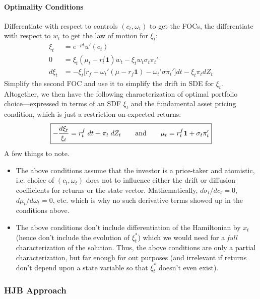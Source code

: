 \documentclass[12pt]{article}
\theoremstyle{plain}
\theoremstyle{definition}
\theoremstyle{remark}
\begin{document}
\paragraph{Optimality Conditions}
Differentiate with respect to controls $(c_t,\omega_t)$ to get the FOCs,
the differentiate with respect to $w_t$ to get the law of motion for
$\xi_t$:
\begin{align*}
  \xi_t
  &=
  e^{-\rho t}
  u'(c_t)
  \\
  0
  &=
  \xi_t(\mu_t-r^f_t\mathbf{1})w_t
  -
  \xi_t
  w_t \sigma_t\pi_t'
  \\
  d\xi_t
  &=
  -\xi_t\big[
  r_f
  + \omega_t'(\mu-r_f\mathbf{1})
  - \omega_t'\sigma\pi_t'
  \big]
  dt
  -
  \xi_t\pi_t
  dZ_t
\end{align*}
Simplify the second FOC and use it to simplify the drift in SDE for
$\xi_t$.
Altogether, we then have the following characterization of optimal
portfolio choice---expressed in terms of an SDF $\xi_t$ and the
fundamental asset pricing condition, which is just a restriction on
expected returns:
\begin{align*}
  \boxed{%
  -
  \frac{d\xi_t}{\xi_t}
  =
  r^f_t
  \;dt
  +
  \pi_t
  \;dZ_t
  \qquad\text{and}\qquad
  \mu_t
  =
  r_t^f\mathbf{1}
  +
  \sigma_t\pi_t'
  }
\end{align*}
A few things to note.
\begin{itemize}
  \item
    The above conditions assume that the investor is a price-taker and
    atomistic, i.e. choice of $(c_t,\omega_t)$ does not to influence
    either the drift or diffusion coefficients for returns or the state
    vector.
    Mathematically, $d\sigma_t/dc_t=0$, $d\mu_t/d\omega_t=0$, etc. which
    is why no such derivative terms showed up in the conditions above.
  \item
    The above conditions don't include differentiation of the
    Hamiltonian by $x_t$ (hence don't include the evolution of
    $\xi_t^*$) which we would need for a \emph{full} characterization of
    the solution.
    Thus, the above conditions are only a partial characterization, but
    far enough for out purposes (and irrelevant if returns don't depend
    upon a state variable so that $\xi_t^*$ doesn't even exist).
\end{itemize}


\clearpage
\subsubsection{HJB Approach}
\end{document}
